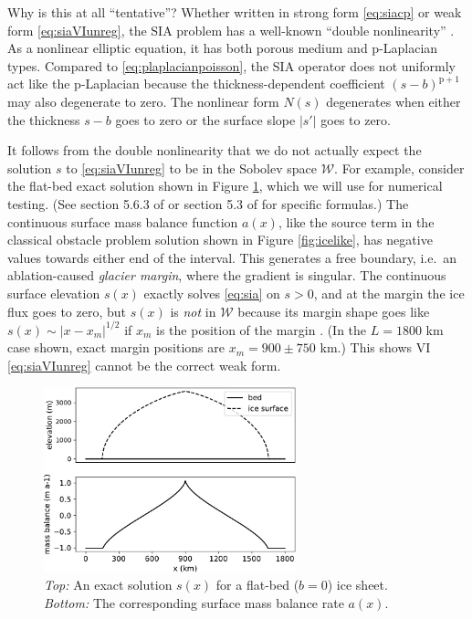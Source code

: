 \documentclass[letterpaper,final,12pt,reqno]{amsart}
\theoremstyle{claim}
\newcommand{\pp}{{\text{p}}}
\numberwithin{equation}{section}
\numberwithin{figure}{section}
\numberwithin{table}{section}
\numberwithin{theorem}{section}
\begin{document}
Why is this at all ``tentative''?  Whether written in strong form \eqref{eq:siacp} or weak form \eqref{eq:siaVIunreg}, the SIA problem has a well-known ``double nonlinearity'' \cite{Calvoetal2002}.  As a nonlinear elliptic equation, it has both porous medium \cite{Evans2010} and $\pp$-Laplacian types. Compared to \eqref{eq:plaplacianpoisson}, the SIA operator does not uniformly act like the $\pp$-Laplacian because the thickness-dependent coefficient $(s-b)^{\pp+1}$ may also degenerate to zero.  The nonlinear form $N(s)$ degenerates when either the thickness $s-b$ goes to zero or the surface slope $|s'|$ goes to zero.

It follows from the double nonlinearity that we do not actually expect the solution $s$ to \eqref{eq:siaVIunreg} to be in the Sobolev space $\mathcal{W}$.  For example, consider the flat-bed exact solution shown in Figure \ref{fig:siadatafigure}, which we will use for numerical testing.  (See section 5.6.3 of \cite{GreveBlatter2009} or section 5.3 of \cite{vanderVeen2013} for specific formulas.)  The continuous surface mass balance function $a(x)$, like the source term in the classical obstacle problem solution shown in Figure \ref{fig:icelike}, has negative values towards either end of the interval.  This generates a free boundary, i.e.~an ablation-caused \emph{glacier margin}, where the gradient is singular.  The continuous surface elevation $s(x)$ exactly solves \eqref{eq:sia} on $s>0$, and at the margin the ice flux goes to zero, but $s(x)$ is \emph{not} in $\mathcal{W}$ because its margin shape goes like $s(x) \sim |x-x_m|^{1/2}$ if $x_m$ is the position of the margin \cite{Bueleretal2005}.  (In the $L=1800$ km case shown, exact margin positions are $x_m=900\pm 750$ km.)  This shows VI \eqref{eq:siaVIunreg} cannot be the correct weak form.

\begin{figure}
\includegraphics[width=0.65\textwidth]{fixfigs/siadatafigure.pdf}
\caption{\emph{Top:} An exact solution $s(x)$ for a flat-bed ($b=0$) ice sheet.  \emph{Bottom:} The corresponding surface mass balance rate $a(x)$.}
\label{fig:siadatafigure}
\end{figure}
\end{document}
